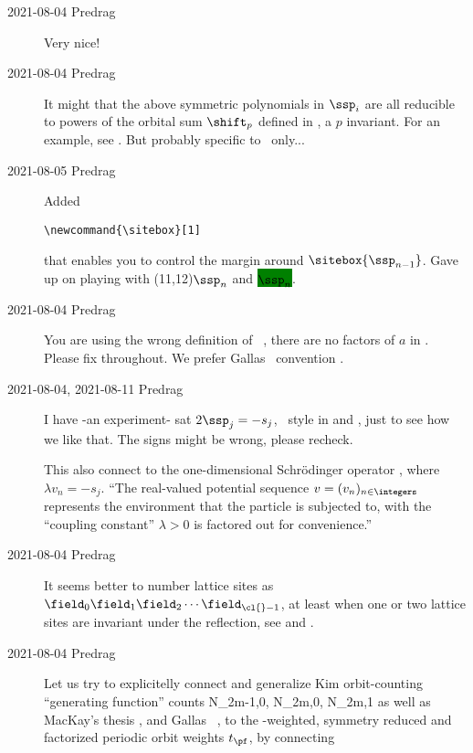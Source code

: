 \begin{description}
\item[2021-08-04 Predrag]
Very nice!

\item[2021-08-04 Predrag]
It might that the above symmetric polynomials in $\ssp_i$ are all
reducible to powers of the orbital sum  $\shift_p$ defined
in , a {\orbit} $p$ invariant. For an example, see
. But probably specific to \Henon\ only...

\item[2021-08-05 Predrag]
Added
\begin{verbatim}
\newcommand{\sitebox}[1]
\end{verbatim}
that enables you to control the margin around
$\sitebox{\ssp_{n-1}}$.
Gave up on playing  with \framebox(11,12){$\ssp_n$} and
\colorbox{green}{$\ssp_n$}.

\item[2021-08-04 Predrag]
You are using the wrong definition of \Henon\ \jacobianOrb,
there are no factors of $a$ in .
Please fix throughout.
We prefer Gallas \etal\ convention .

\item[2021-08-04, 2021-08-11 Predrag]
I have -an experiment- sat $2 \ssp_j = - {s}_j$, \templatt\ style in
 and , just to see how we like
that. The signs might be wrong, please recheck.

This also connect to the one-dimensional Schr{\"o}dinger operator
, where $\lambda v_n = - {s}_j$.
``The real-valued potential sequence $v=(v_n)_{n\in \integers}$
represents the environment that the particle is subjected to, with the
``coupling constant'' $\lambda>0$ is factored out for convenience.''

\item[2021-08-04 Predrag]
It
seems better to number lattice sites as
$\field_0\field_1\field_2\cdots\field_{\cl{}-1}$, at least
when one or two lattice sites are invariant under the reflection,
see  and .

\item[2021-08-04 Predrag]
Let us try to explicitelly connect and generalize Kim \etal{}
orbit-counting ``generating function''  counts
\beq
       {N}_{2m-1,0},
       {N}_{2m,0},
       {N}_{2m,1}
as well as MacKay's thesis
,
and Gallas \etal\ ,
to the {\HillDet}-weighted, symmetry reduced and factorized periodic
orbit weights $t_{\pf}$, by connecting


\end{description}
